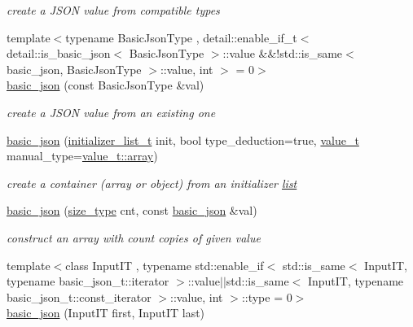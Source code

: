 \begin{DoxyCompactItemize}
\begin{DoxyCompactList}\small\item\em create a J\+S\+ON value from compatible types \end{DoxyCompactList}\item 
{\footnotesize template$<$typename Basic\+Json\+Type , detail\+::enable\+\_\+if\+\_\+t$<$ detail\+::is\+\_\+basic\+\_\+json$<$ Basic\+Json\+Type $>$\+::value \&\&!std\+::is\+\_\+same$<$ basic\+\_\+json, Basic\+Json\+Type $>$\+::value, int $>$  = 0$>$ }\\\hyperlink{classnlohmann_1_1basic__json_a40738eb9cb8c5a9ca14ae4b697c29f8e}{basic\+\_\+json} (const Basic\+Json\+Type \&val)
\begin{DoxyCompactList}\small\item\em create a J\+S\+ON value from an existing one \end{DoxyCompactList}\item 
\hyperlink{classnlohmann_1_1basic__json_aeac617faf3448d6d2cb33a020be01d37}{basic\+\_\+json} (\hyperlink{classnlohmann_1_1basic__json_ac569f292a070dfd2f6b69c16e746095a}{initializer\+\_\+list\+\_\+t} init, bool type\+\_\+deduction=true, \hyperlink{namespacenlohmann_1_1detail_a1ed8fc6239da25abcaf681d30ace4985}{value\+\_\+t} manual\+\_\+type=\hyperlink{namespacenlohmann_1_1detail_a1ed8fc6239da25abcaf681d30ace4985af1f713c9e000f5d3f280adbd124df4f5}{value\+\_\+t\+::array})
\begin{DoxyCompactList}\small\item\em create a container (array or object) from an initializer \hyperlink{protocollist-p}{list} \end{DoxyCompactList}\item 
\hyperlink{classnlohmann_1_1basic__json_afbccea367512a87b5d76e2bd92c5cc85}{basic\+\_\+json} (\hyperlink{classnlohmann_1_1basic__json_a3ada29bca70b4965f6fd37ec1c8f85f7}{size\+\_\+type} cnt, const \hyperlink{classnlohmann_1_1basic__json}{basic\+\_\+json} \&val)
\begin{DoxyCompactList}\small\item\em construct an array with count copies of given value \end{DoxyCompactList}\item 
{\footnotesize template$<$class Input\+IT , typename std\+::enable\+\_\+if$<$ std\+::is\+\_\+same$<$ Input\+I\+T, typename basic\+\_\+json\+\_\+t\+::iterator $>$\+::value$\vert$$\vert$std\+::is\+\_\+same$<$ Input\+I\+T, typename basic\+\_\+json\+\_\+t\+::const\+\_\+iterator $>$\+::value, int $>$\+::type  = 0$>$ }\\\hyperlink{classnlohmann_1_1basic__json_a23e540f473d32f1cf5d3243ea3ad495e}{basic\+\_\+json} (Input\+IT first, Input\+IT last)

\end{DoxyCompactItemize}
